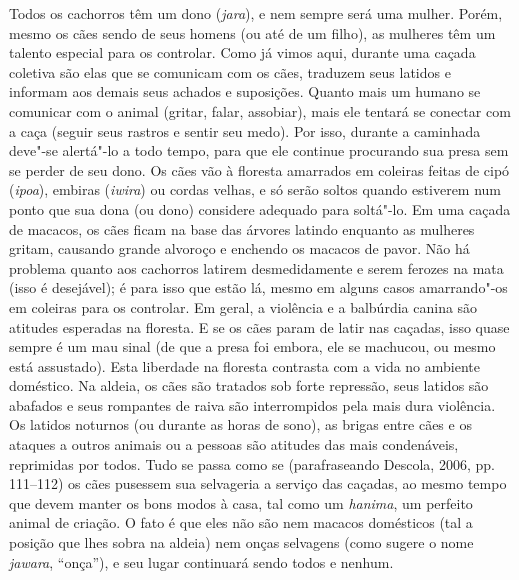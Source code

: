 Todos os cachorros têm um dono (\emph{jara}), e nem sempre será uma
mulher. Porém, mesmo os cães sendo de seus homens (ou até de um filho),
as mulheres têm um talento especial para os controlar. Como já vimos
aqui, durante uma caçada coletiva são elas que se comunicam com os cães,
traduzem seus latidos e informam aos demais seus achados e suposições.
Quanto mais um humano se comunicar com o animal (gritar, falar,
assobiar), mais ele tentará se conectar com a caça (seguir seus rastros
e sentir seu medo). Por isso, durante a caminhada deve"-se alertá"-lo a
todo tempo, para que ele continue procurando sua presa sem se perder de
seu dono. Os cães vão à floresta amarrados em coleiras feitas de cipó
(\emph{ipoa}), embiras (\emph{iwira}) ou cordas velhas, e só serão
soltos quando estiverem num ponto que sua dona (ou dono) considere
adequado para soltá"-lo. Em uma caçada de macacos, os cães ficam na base
das árvores latindo enquanto as mulheres gritam, causando grande
alvoroço e enchendo os macacos de pavor. Não há problema quanto aos
cachorros latirem desmedidamente e serem ferozes na mata (isso é
desejável); é para isso que estão lá, mesmo em alguns casos amarrando"-os
em coleiras para os controlar. Em geral, a violência e a balbúrdia
canina são atitudes esperadas na floresta. E se os cães param de latir
nas caçadas, isso quase sempre é um mau sinal (de que a presa foi
embora, ele se machucou, ou mesmo está assustado). Esta liberdade na
floresta contrasta com a vida no ambiente doméstico. Na aldeia, os cães
são tratados sob forte repressão, seus latidos são abafados e seus
rompantes de raiva são interrompidos pela mais dura violência. Os
latidos noturnos (ou durante as horas de sono), as brigas entre cães e
os ataques a outros animais ou a pessoas são atitudes das mais
condenáveis, reprimidas por todos. Tudo se passa como se (parafraseando
Descola, 2006, pp. 111--112) os cães pusessem sua selvageria a serviço
das caçadas, ao mesmo tempo que devem manter os bons modos à casa, tal
como um \emph{hanima}, um perfeito animal de criação. O fato é que eles
não são nem macacos domésticos (tal a posição que lhes sobra na aldeia)
nem onças selvagens (como sugere o nome \emph{jawara}, ``onça''), e seu
lugar continuará sendo todos e nenhum.

